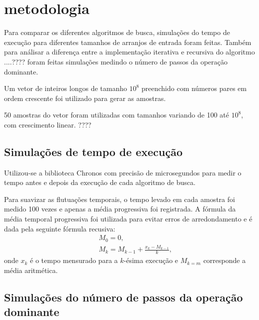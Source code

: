\section{metodologia}

Para comparar os diferentes algoritmos de busca, simulações do tempo de execução para diferentes tamanhos de arranjos de entrada foram feitas. Também para análisar a diferença entre a implementação iterativa e recursiva do algoritmo ....???? foram feitas simulações medindo o número de passos da operação dominante. 


Um vetor de inteiros longos de tamanho $10^8$ preenchido com números pares em ordem crescente foi utilizado para gerar as amostras. 

50 amostras do vetor foram utilizadas com tamanhos variando de 100 até $10^8$, com crescimento linear. ????

\subsection{Simulações de tempo de execução}

Utilizou-se a biblioteca Chronos com precisão de microsegundos para medir o tempo antes e depois da execução de cada algoritmo de busca.

Para suavizar as flutuações temporais, o tempo levado em cada amostra foi medido 100 vezes e apenas a média progressiva foi registrada. A fórmula da média temporal progressiva foi utilizada para evitar erros de arredondamento e é dada pela seguinte fórmula recusiva:
\begin{eqnarray}
&&M_0 = 0, \nonumber \\
&&M_k = M_{k-1} + \frac{x_k-M_{k-1}}{k},
\end{eqnarray}
onde $x_k$ é o tempo mensurado para a $k$-ésima execução e $M_{k=m}$ corresponde a média aritmética.


\subsection{Simulações do número de passos da operação dominante}
